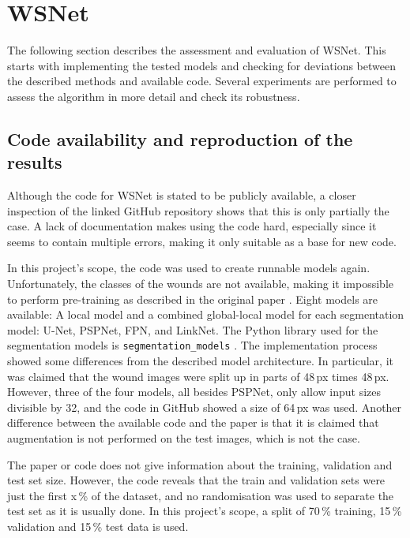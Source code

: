 \section{WSNet}

The following section describes the assessment and evaluation of WSNet. This starts with implementing the tested models and checking for deviations between the described methods and available code. Several experiments are performed to assess the algorithm in more detail and check its robustness.

\subsection{Code availability and reproduction of the results}

Although the code for WSNet \cite{Oota_2023_WACV} is stated to be publicly available, a closer inspection of the linked GitHub repository shows that this is only partially the case. A lack of documentation makes using the code hard, especially since it seems to contain multiple errors, making it only suitable as a base for new code.

In this project's scope, the code was used to create runnable models again. Unfortunately, the classes of the wounds are not available, making it impossible to perform pre-training as described in the original paper \cite{Oota_2023_WACV}. Eight models are available: A local model and a combined global-local model for each segmentation model: U-Net, PSPNet, FPN, and LinkNet. The Python library used for the segmentation models is \texttt{segmentation\_models} \cite{SegmentationModels}. The implementation process showed some differences from the described model architecture. In particular, it was claimed that the wound images were split up in parts of 48\,px times 48\,px. However, three of the four models, all besides PSPNet, only allow input sizes divisible by 32, and the code in GitHub showed a size of 64\,px was used. Another difference between the available code and the paper is that it is claimed that augmentation is not performed on the test images, which is not the case.

The paper or code does not give information about the training, validation and test set size. However, the code reveals that the train and validation sets were just the first x\,\% of the dataset, and no randomisation was used to separate the test set as it is usually done. In this project's scope, a split of 70\,\% training, 15\,\% validation and 15\,\% test data is used.

